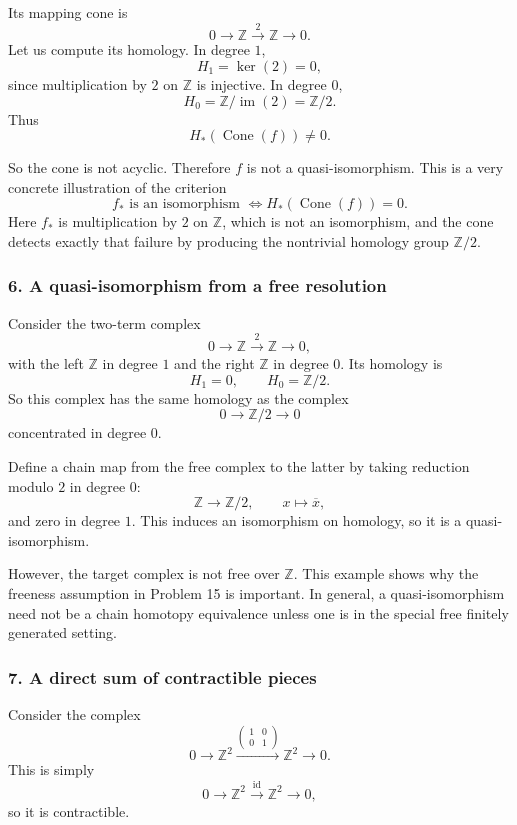 \documentclass[12pt,a4paper]{article}
\theoremstyle{notespace}
\begin{document}
Its mapping cone is
\[
0\longrightarrow \mathbb Z \xrightarrow{2} \mathbb Z \longrightarrow 0.
\]
Let us compute its homology. In degree \(1\),
\[
H_1=\ker(2)=0,
\]
since multiplication by \(2\) on \(\mathbb Z\) is injective. In degree \(0\),
\[
H_0=\mathbb Z/\operatorname{im}(2)=\mathbb Z/2.
\]
Thus
\[
H_*(\operatorname{Cone}(f))\neq 0.
\]

So the cone is not acyclic. Therefore \(f\) is not a quasi-isomorphism. This is a very concrete illustration of the criterion
\[
f_* \text{ is an isomorphism }
\Longleftrightarrow
H_*(\operatorname{Cone}(f))=0.
\]
Here \(f_*\) is multiplication by \(2\) on \(\mathbb Z\), which is not an isomorphism, and the cone detects exactly that failure by producing the nontrivial homology group \(\mathbb Z/2\).

\subsubsection*{6. A quasi-isomorphism from a free resolution}

Consider the two-term complex
\[
0 \longrightarrow \mathbb Z \xrightarrow{2} \mathbb Z \longrightarrow 0,
\]
with the left \(\mathbb Z\) in degree \(1\) and the right \(\mathbb Z\) in degree \(0\). Its homology is
\[
H_1=0,
\qquad
H_0=\mathbb Z/2.
\]
So this complex has the same homology as the complex
\[
0\longrightarrow \mathbb Z/2 \longrightarrow 0
\]
concentrated in degree \(0\).

Define a chain map from the free complex to the latter by taking reduction modulo \(2\) in degree \(0\):
\[
\mathbb Z \to \mathbb Z/2,\qquad x\mapsto \overline{x},
\]
and zero in degree \(1\). This induces an isomorphism on homology, so it is a quasi-isomorphism.

However, the target complex is not free over \(\mathbb Z\). This example shows why the freeness assumption in Problem 15 is important. In general, a quasi-isomorphism need not be a chain homotopy equivalence unless one is in the special free finitely generated setting.

\subsubsection*{7. A direct sum of contractible pieces}

Consider the complex
\[
0 \longrightarrow \mathbb Z^2 \xrightarrow{
	\begin{pmatrix}
		1 & 0\\
		0 & 1
	\end{pmatrix}
} \mathbb Z^2 \longrightarrow 0.
\]
This is simply
\[
0\longrightarrow \mathbb Z^2 \xrightarrow{\mathrm{id}} \mathbb Z^2 \longrightarrow 0,
\]
so it is contractible.
\end{document}
